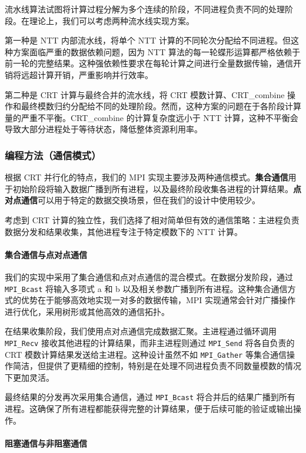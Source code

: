 \documentclass[a4paper]{article}
\begin{document}
流水线算法试图将计算过程分解为多个连续的阶段，不同进程负责不同的处理阶段。在理论上，我们可以考虑两种流水线实现方案。

第一种是 NTT 内部流水线，将单个 NTT 计算的不同轮次分配给不同进程。但这种方案面临严重的数据依赖问题，因为 NTT 算法的每一轮蝶形运算都严格依赖于前一轮的完整结果。这种强依赖性要求在每轮计算之间进行全量数据传输，通信开销将远超计算开销，严重影响并行效率。

第二种是 CRT 计算与最终合并的流水线，将 CRT 模数计算、CRT\_combine 操作和最终模数归约分配给不同的处理阶段。然而，这种方案的问题在于各阶段计算量的严重不平衡。CRT\_combine 的计算复杂度远小于 NTT 计算，这种不平衡会导致大部分进程处于等待状态，降低整体资源利用率。

\subsubsection{编程方法（通信模式）}

根据 CRT 并行化的特点，我们的 MPI 实现主要涉及两种通信模式。\textbf{集合通信}用于初始阶段将输入数据广播到所有进程，以及最终阶段收集各进程的计算结果。\textbf{点对点通信}可以用于特定的数据交换场景，但在我们的设计中使用较少。

考虑到 CRT 计算的独立性，我们选择了相对简单但有效的通信策略：主进程负责数据分发和结果收集，其他进程专注于特定模数下的 NTT 计算。

\paragraph{集合通信与点对点通信}

我们的实现中采用了集合通信和点对点通信的混合模式。在数据分发阶段，通过 \texttt{MPI\_Bcast} 将输入多项式 a 和 b 以及相关参数广播到所有进程。这种集合通信方式的优势在于能够高效地实现一对多的数据传输，MPI 实现通常会针对广播操作进行优化，采用树形或其他高效的通信拓扑。

在结果收集阶段，我们使用点对点通信完成数据汇聚。主进程通过循环调用 \texttt{MPI\_Recv} 接收其他进程的计算结果，而非主进程则通过 \texttt{MPI\_Send} 将各自负责的 CRT 模数计算结果发送给主进程。这种设计虽然不如 \texttt{MPI\_Gather} 等集合通信操作简洁，但提供了更精细的控制，特别是在处理不同进程负责不同数量模数的情况下更加灵活。

最终结果的分发再次采用集合通信，通过 \texttt{MPI\_Bcast} 将合并后的结果广播到所有进程。这确保了所有进程都能获得完整的计算结果，便于后续可能的验证或输出操作。

\paragraph{阻塞通信与非阻塞通信}
\end{document}
